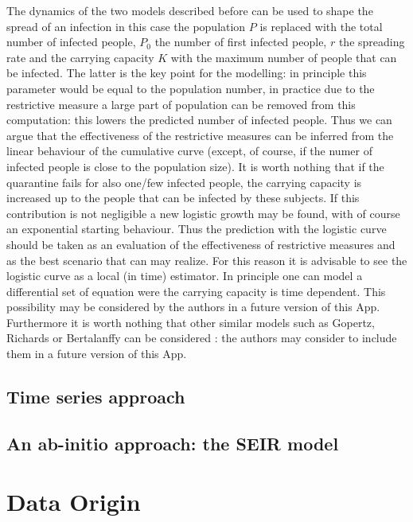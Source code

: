 \documentclass[
12pt, %
a4paper, %
oneside, %
headinclude,footinclude, %
BCOR5mm, %
]{scrartcl}
\begin{document}
The dynamics of the two models described before can be used to shape the spread of an infection \cite{serfling1952historical,ma2014estimating} in this case the population $P$ is replaced with the total number of infected people, $P_{0}$ the number of first infected people, $r$ the spreading rate and the carrying capacity $K$ with the maximum number of people that can be infected. The latter is the key point for the modelling: in principle this parameter would be equal to the population number, in practice due to the restrictive measure a large part of population can be removed from this computation: this lowers the predicted number of infected people. Thus we can argue that the effectiveness of the restrictive measures can be inferred from the linear behaviour of the cumulative curve (except, of course, if the numer of infected people is close to the population size). It is worth nothing that if the quarantine fails for also one/few infected people, the carrying capacity is increased up to the people that can be infected by these subjects. If this contribution is not negligible a new logistic growth may be found, with of course an exponential starting behaviour. Thus the prediction with the logistic curve should be taken as an evaluation of the effectiveness of restrictive measures and as the best scenario that can may realize. For this reason it is advisable to see the logistic curve as a local (in time) estimator. In principle one can model a differential set of equation were the carrying capacity is time dependent. This possibility may be considered  by the authors in a future version of this App. Furthermore it is worth nothing that other similar models such as Gopertz, Richards or Bertalanffy can be considered \cite{ma2014estimating} : the authors may consider to include them in  a future version of this App.



\subsection{Time series approach}

\subsection{An ab-initio approach: the SEIR model}


\section{Data Origin} \label{Data Origin}
\end{document}

